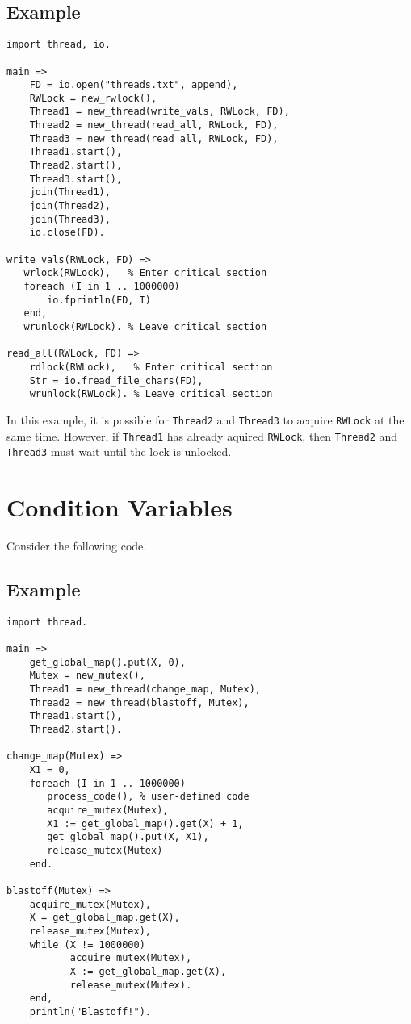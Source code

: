 \subsection*{Example}
\begin{verbatim}
import thread, io.

main =>
    FD = io.open("threads.txt", append),
    RWLock = new_rwlock(),
    Thread1 = new_thread(write_vals, RWLock, FD),
    Thread2 = new_thread(read_all, RWLock, FD),
    Thread3 = new_thread(read_all, RWLock, FD),
    Thread1.start(),
    Thread2.start(),
    Thread3.start(),
    join(Thread1),
    join(Thread2),
    join(Thread3),
    io.close(FD).

write_vals(RWLock, FD) =>
   wrlock(RWLock),   % Enter critical section
   foreach (I in 1 .. 1000000)
       io.fprintln(FD, I)
   end,
   wrunlock(RWLock). % Leave critical section

read_all(RWLock, FD) =>
    rdlock(RWLock),   % Enter critical section
    Str = io.fread_file_chars(FD),
    wrunlock(RWLock). % Leave critical section
\end{verbatim}

In this example, it is possible for \texttt{Thread2} and \texttt{Thread3} to acquire \texttt{RWLock} at the same time.  However, if \texttt{Thread1} has already aquired \texttt{RWLock}, then \texttt{Thread2} and \texttt{Thread3} must wait until the lock is unlocked.

\section{Condition Variables}
Consider the following code.

\subsection*{Example}
\begin{verbatim}
import thread.

main =>
    get_global_map().put(X, 0),
    Mutex = new_mutex(),
    Thread1 = new_thread(change_map, Mutex),
    Thread2 = new_thread(blastoff, Mutex),
    Thread1.start(),
    Thread2.start().

change_map(Mutex) =>
    X1 = 0,
    foreach (I in 1 .. 1000000)
       process_code(), % user-defined code
       acquire_mutex(Mutex),
       X1 := get_global_map().get(X) + 1,
       get_global_map().put(X, X1),
       release_mutex(Mutex) 
    end.
    
blastoff(Mutex) =>
    acquire_mutex(Mutex),
    X = get_global_map.get(X),
    release_mutex(Mutex),
    while (X != 1000000)
           acquire_mutex(Mutex),
           X := get_global_map.get(X),
           release_mutex(Mutex).
    end,
    println("Blastoff!").
\end{verbatim}

